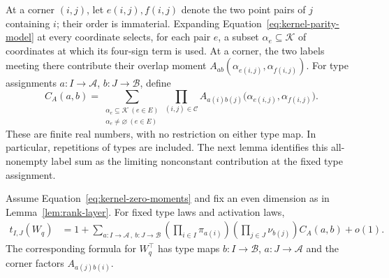 At a corner $(i,j)$, let $e(i,j),f(i,j)$ denote the two point pairs
of $j$ containing $i$; their order is immaterial. Expanding
Equation~\eqref{eq:kernel-parity-model} at every coordinate selects,
for each pair \(e\), a subset \(\alpha_e\subseteq\mathcal K\) of
coordinates at which its four-sign term is used. At a corner, the
two labels meeting there contribute their overlap moment
\(A_{ab}(\alpha_{e(i,j)},\alpha_{f(i,j)})\).
For type assignments
$a:I\to\mathcal A$, $b:J\to\mathcal B$, define
\begin{equation}
 C_A(a,b)=
 \sum_{\substack{\alpha_e\subseteq\mathcal K\ (e\in E)\\
                   \alpha_e\ne\varnothing\ (e\in E)}}
 \prod_{(i,j)\in\mathscr C}
 A_{a(i)b(j)}\bigl(\alpha_{e(i,j)},\alpha_{f(i,j)}\bigr).
 \label{eq:kernel-coefficient}
\end{equation}
These are finite real numbers, with no restriction on either type
map. In particular, repetitions of types are included.
The next lemma identifies this all-nonempty label sum as the
limiting nonconstant contribution at the fixed type assignment.

\begin{lemma}
\label{lem:kernel-expansion}
Assume Equation~\eqref{eq:kernel-zero-moments} and fix an even dimension
as in Lemma~\ref{lem:rank-layer}. For fixed type laws and activation
laws,
\begin{align}
 t_{I,J}(W_q)&=1+
 \sum_{a:I\to\mathcal A\,,\ b:J\to\mathcal B}
 \left(\prod_{i\in I}\pi_{a(i)}\right)
 \left(\prod_{j\in J}\nu_{b(j)}\right)C_A(a,b)+o(1).
 \label{eq:kernel-expansion}
\end{align}
The corresponding formula for $W_q^\top$ has type maps
$b:I\to\mathcal B$, $a:J\to\mathcal A$ and the corner factors
$A_{a(j)b(i)}$.
\end{lemma}

